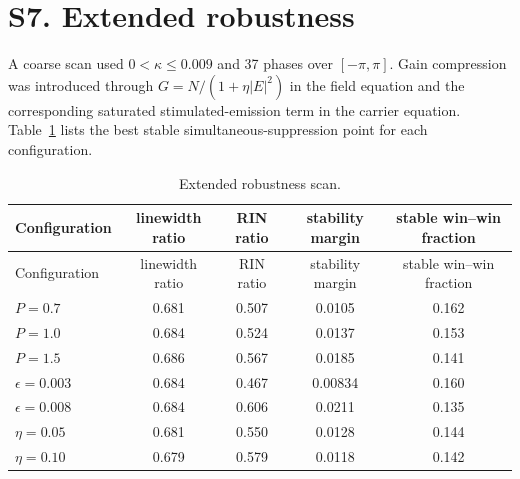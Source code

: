 \documentclass[11pt]{article}
\begin{document}
\section*{S7. Extended robustness}

A coarse scan used $0<\kappa\leq0.009$ and 37 phases over $[-\pi,\pi]$. Gain compression was introduced through $G=N/(1+\eta |E|^2)$ in the field equation and the corresponding saturated stimulated-emission term in the carrier equation. Table~\ref{tab:robust} lists the best stable simultaneous-suppression point for each configuration.

\begin{longtable}{lcccc}
\caption{Extended robustness scan.}\label{tab:robust}\\
\toprule
Configuration & linewidth ratio & RIN ratio & stability margin & stable win--win fraction\\
\midrule
\endfirsthead
\toprule
Configuration & linewidth ratio & RIN ratio & stability margin & stable win--win fraction\\
\midrule
\endhead
$P=0.7$ & 0.681 & 0.507 & 0.0105 & 0.162\\
$P=1.0$ & 0.684 & 0.524 & 0.0137 & 0.153\\
$P=1.5$ & 0.686 & 0.567 & 0.0185 & 0.141\\
$\epsilon=0.003$ & 0.684 & 0.467 & 0.00834 & 0.160\\
$\epsilon=0.008$ & 0.684 & 0.606 & 0.0211 & 0.135\\
$\eta=0.05$ & 0.681 & 0.550 & 0.0128 & 0.144\\
$\eta=0.10$ & 0.679 & 0.579 & 0.0118 & 0.142\\
\bottomrule
\end{longtable}
\end{document}
